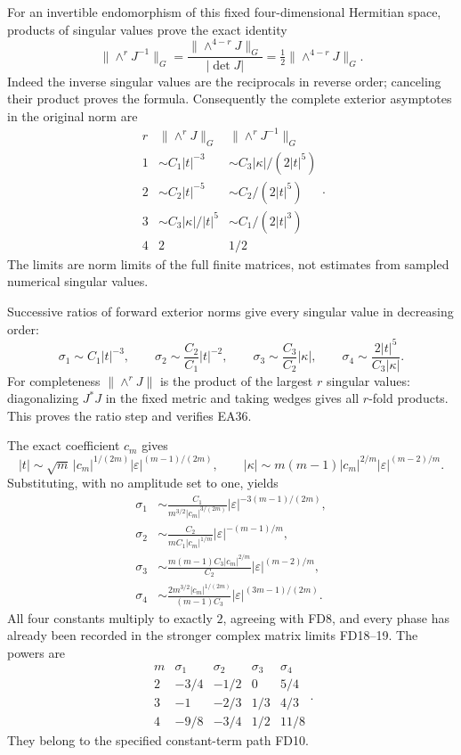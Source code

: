 For an invertible endomorphism of this fixed four-dimensional
Hermitian space, products of singular values prove the exact
identity
\[
 \|\wedge^rJ^{-1}\|_G
            =\frac{\|\wedge^{4-r}J\|_G}{|\det J|}
            =\tfrac12\|\wedge^{4-r}J\|_G .
 \tag{FD24}
\]
Indeed the inverse singular values are the reciprocals
in reverse order; canceling their product proves the
formula. Consequently the complete exterior asymptotes
in the original norm are
\[
\begin{array}{c|c|c}
 r&\|\wedge^rJ\|_G&\|\wedge^rJ^{-1}\|_G\\\hline
 1&\sim C_1|t|^{-3}&\sim C_3|\kappa|/(2|t|^5)\\
 2&\sim C_2|t|^{-5}&\sim C_2/(2|t|^5)\\
 3&\sim C_3|\kappa|/|t|^5&\sim C_1/(2|t|^3)\\
 4&2&1/2
\end{array}.\tag{FD25}
\]
The limits are norm limits of the full finite matrices,
not estimates from sampled numerical singular values.

Successive ratios of forward exterior norms give every
singular value in decreasing order:
\[
\boxed{\quad
 \sigma_1\sim C_1|t|^{-3},\qquad
 \sigma_2\sim\frac{C_2}{C_1}|t|^{-2},\qquad
 \sigma_3\sim\frac{C_3}{C_2}|\kappa|,\qquad
 \sigma_4\sim\frac{2|t|^5}{C_3|\kappa|}.
 \quad}\tag{FD26}
\]
For completeness \(\|\wedge^rJ\|\) is the product of the
largest \(r\) singular values: diagonalizing \(J^*J\) in
the fixed metric and taking wedges gives all \(r\)-fold
products. This proves the ratio step and verifies EA36.

The exact coefficient \(c_m\) gives
\[
 |t|\sim\sqrt m\,|c_m|^{1/(2m)}
                       |\varepsilon|^{(m-1)/(2m)},\qquad
 |\kappa|\sim m(m-1)|c_m|^{2/m}
                       |\varepsilon|^{(m-2)/m}.
 \tag{FD27}
\]
Substituting, with no amplitude set to one, yields
\[
\boxed{\begin{aligned}
 \sigma_1&\sim\frac{C_1}{m^{3/2}|c_m|^{3/(2m)}}
                  |\varepsilon|^{-3(m-1)/(2m)},\\
 \sigma_2&\sim\frac{C_2}{mC_1|c_m|^{1/m}}
                  |\varepsilon|^{-(m-1)/m},\\
 \sigma_3&\sim\frac{m(m-1)C_3|c_m|^{2/m}}{C_2}
                  |\varepsilon|^{(m-2)/m},\\
 \sigma_4&\sim\frac{2m^{3/2}|c_m|^{1/(2m)}}{(m-1)C_3}
                  |\varepsilon|^{(3m-1)/(2m)}.
\end{aligned}}\tag{FD28}
\]
All four constants multiply to exactly \(2\), agreeing
with FD8, and every phase has already been recorded in
the stronger complex matrix limits FD18--19. The powers are
\[
\begin{array}{c|rrrr}
m&\sigma_1&\sigma_2&\sigma_3&\sigma_4\\\hline
2&-3/4&-1/2&0&5/4\\
3&-1&-2/3&1/3&4/3\\
4&-9/8&-3/4&1/2&11/8
\end{array}.
\]
They belong to the specified constant-term path FD10.

